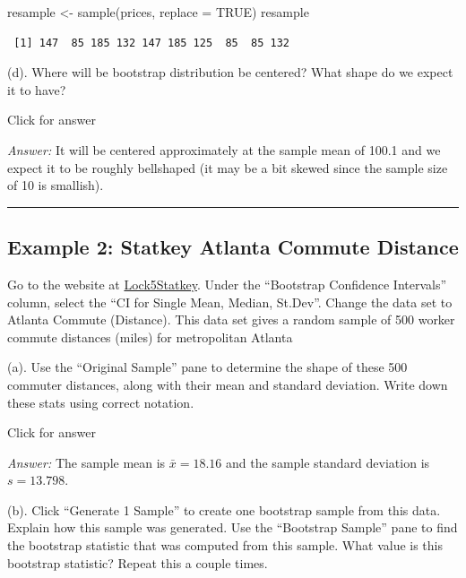 \documentclass[
]{book}
\newenvironment{Shaded}{\begin{snugshade}}{\end{snugshade}}
\newcommand{\AttributeTok}[1]{\textcolor[rgb]{0.77,0.63,0.00}{#1}}
\newcommand{\ConstantTok}[1]{\textcolor[rgb]{0.00,0.00,0.00}{#1}}
\newcommand{\FunctionTok}[1]{\textcolor[rgb]{0.00,0.00,0.00}{#1}}
\newcommand{\NormalTok}[1]{#1}
\newcommand{\OtherTok}[1]{\textcolor[rgb]{0.56,0.35,0.01}{#1}}
\begin{document}
\begin{Shaded}
\begin{Highlighting}[]
\NormalTok{resample }\OtherTok{\textless{}{-}} \FunctionTok{sample}\NormalTok{(prices, }\AttributeTok{replace =} \ConstantTok{TRUE}\NormalTok{)}
\NormalTok{resample}
\end{Highlighting}
\end{Shaded}

\begin{verbatim}
 [1] 147  85 185 132 147 185 125  85  85 132
\end{verbatim}

(d). Where will be bootstrap distribution be centered? What shape do we expect it to have?

Click for answer

\emph{Answer:} It will be centered approximately at the sample mean of 100.1 and we expect it to be roughly bellshaped (it may be a bit skewed since the sample size of 10 is smallish).

\begin{center}\rule{0.5\linewidth}{0.5pt}\end{center}

\hypertarget{example-2-statkey-atlanta-commute-distance}{%
\subsection{Example 2: Statkey Atlanta Commute Distance}\label{example-2-statkey-atlanta-commute-distance}}

Go to the website at \href{http://www.lock5stat.com/StatKey/}{Lock5Statkey}. Under the ``Bootstrap Confidence Intervals'' column, select the ``CI for Single Mean, Median, St.Dev''. Change the data set to Atlanta Commute (Distance). This data set gives a random sample of 500 worker commute distances (miles) for metropolitan Atlanta

(a). Use the ``Original Sample'' pane to determine the shape of these 500 commuter distances, along with their mean and standard deviation. Write down these stats using correct notation.

Click for answer

\emph{Answer:} The sample mean is \(\bar{x} = 18.16\) and the sample standard deviation is \(s = 13.798\).

(b). Click ``Generate 1 Sample'' to create one bootstrap sample from this data. Explain how this sample was generated. Use the ``Bootstrap Sample'' pane to find the bootstrap statistic that was computed from this sample. What value is this bootstrap statistic? Repeat this a couple times.
\end{document}
